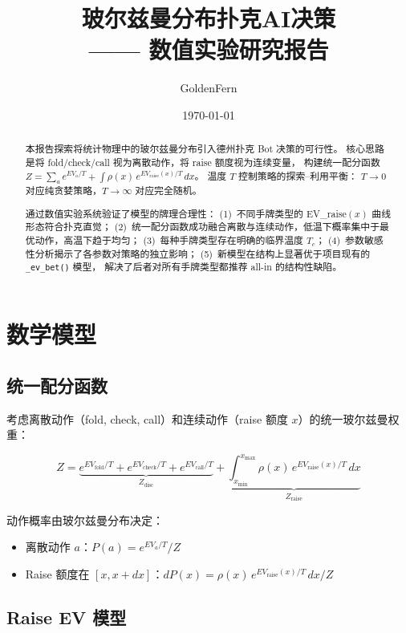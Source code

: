 \documentclass[12pt,a4paper]{ctexart}
\title{\textbf{玻尔兹曼分布扑克AI决策\\—— 数值实验研究报告}}
\author{GoldenFern}
\date{\today}
\begin{document}
\maketitle

\begin{abstract}
本报告探索将统计物理中的玻尔兹曼分布引入德州扑克 Bot 决策的可行性。
核心思路是将 fold/check/call 视为离散动作，将 raise 额度视为连续变量，
构建统一配分函数 $Z = \sum_a e^{EV_a/T} + \int \rho(x)\,e^{EV_{\text{raise}}(x)/T}\,dx$。
温度 $T$ 控制策略的探索--利用平衡：
$T\to 0$ 对应纯贪婪策略，$T\to\infty$ 对应完全随机。

通过数值实验系统验证了模型的牌理合理性：
(1)~不同手牌类型的 EV\_raise$(x)$ 曲线形态符合扑克直觉；
(2)~统一配分函数成功融合离散与连续动作，低温下概率集中于最优动作，高温下趋于均匀；
(3)~每种手牌类型存在明确的临界温度 $T_c$；
(4)~参数敏感性分析揭示了各参数对策略的独立影响；
(5)~新模型在结构上显著优于项目现有的 \texttt{\_ev\_bet()} 模型，
解决了后者对所有手牌类型都推荐 all-in 的结构性缺陷。
\end{abstract}

\section{数学模型}

\subsection{统一配分函数}

考虑离散动作（fold, check, call）和连续动作（raise 额度 $x$）的统一玻尔兹曼权重：

\begin{equation}
Z = \underbrace{e^{EV_{\text{fold}}/T} + e^{EV_{\text{check}}/T} + e^{EV_{\text{call}}/T}}_{Z_{\text{disc}}}
    + \underbrace{\int_{x_{\min}}^{x_{\max}} \rho(x)\,e^{EV_{\text{raise}}(x)/T}\,dx}_{Z_{\text{raise}}}
\label{eq:partition}
\end{equation}

动作概率由玻尔兹曼分布决定：
\begin{itemize}
    \item 离散动作 $a$：$P(a) = e^{EV_a/T} / Z$
    \item Raise 额度在 $[x, x+dx]$：$dP(x) = \rho(x)\,e^{EV_{\text{raise}}(x)/T}\,dx / Z$
\end{itemize}

\subsection{Raise EV 模型}
\end{document}
